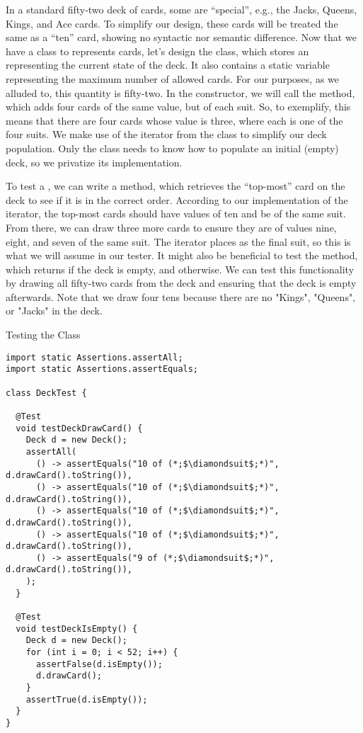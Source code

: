 In a standard fifty-two deck of cards, some are ``special'', e.g., the Jacks, Queens, Kings, and Ace cards. To simplify our design, these cards will be treated the same as a ``ten'' card, showing no syntactic nor semantic difference. Now that we have a class to represents cards, let's design the  class, which stores an  representing the current state of the deck. It also contains a static variable representing the maximum number of allowed cards. For our purposes, as we alluded to, this quantity is fifty-two. In the  constructor, we will call the  method, which adds four cards of the same value, but of each suit. So, to exemplify, this means that there are four cards whose value is three, where each is one of the four suits. We make use of the iterator from the  class to simplify our deck population. Only the  class needs to know how to populate an initial (empty) deck, so we privatize its implementation.

To test a , we can write a  method, which retrieves the ``top-most'' card on the deck to see if it is in the correct order. According to our implementation of the iterator, the top-most cards should have values of ten and be of the same suit. From there, we can draw three more cards to ensure they are of values nine, eight, and seven of the same suit. The iterator places  as the final suit, so this is what we will assume in our tester. It might also be beneficial to test the  method, which returns  if the deck is empty, and  otherwise. We can test this functionality by drawing all fifty-two cards from the deck and ensuring that the deck is empty afterwards. Note that we draw four tens because there are no "Kings", "Queens", or "Jacks" in the deck.

\begin{cl}{Testing the  Class}
\begin{lstlisting}[language=MyJava]
import static Assertions.assertAll;
import static Assertions.assertEquals;

class DeckTest {

  @Test
  void testDeckDrawCard() {
    Deck d = new Deck();
    assertAll(
      () -> assertEquals("10 of (*;$\diamondsuit$;*)", d.drawCard().toString()),
      () -> assertEquals("10 of (*;$\diamondsuit$;*)", d.drawCard().toString()),
      () -> assertEquals("10 of (*;$\diamondsuit$;*)", d.drawCard().toString()),
      () -> assertEquals("10 of (*;$\diamondsuit$;*)", d.drawCard().toString()),
      () -> assertEquals("9 of (*;$\diamondsuit$;*)", d.drawCard().toString()),
    );
  }

  @Test
  void testDeckIsEmpty() {
    Deck d = new Deck();
    for (int i = 0; i < 52; i++) {
      assertFalse(d.isEmpty());
      d.drawCard();
    }
    assertTrue(d.isEmpty());
  }
}
\end{lstlisting}
\end{cl}


